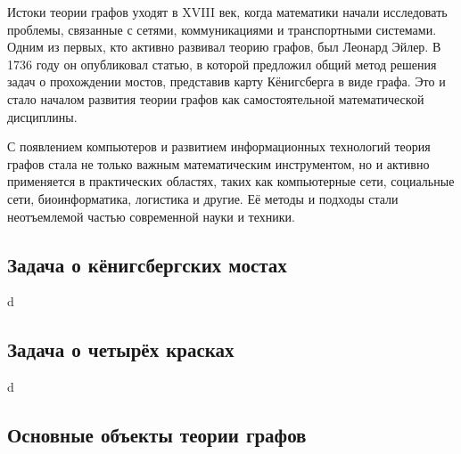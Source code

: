 Истоки теории графов уходят в XVIII век, когда математики начали исследовать проблемы, связанные с сетями, коммуникациями и транспортными системами. Одним из первых, кто активно развивал теорию графов, был Леонард Эйлер. В 1736 году он опубликовал статью, в которой предложил общий метод решения задач о прохождении мостов, представив карту Кёнигсберга в виде графа. Это и стало началом развития теории графов как самостоятельной математической дисциплины.

%

С появлением компьютеров и развитием информационных технологий теория графов стала не только важным математическим инструментом, но и активно применяется в практических областях, таких как компьютерные сети, социальные сети, биоинформатика, логистика и другие. Её методы и подходы стали неотъемлемой частью современной науки и техники.

\subsection{Задача о кёнигсбергских мостах}

d

\subsection{Задача о четырёх красках}

d

\subsection{Основные объекты теории графов}

